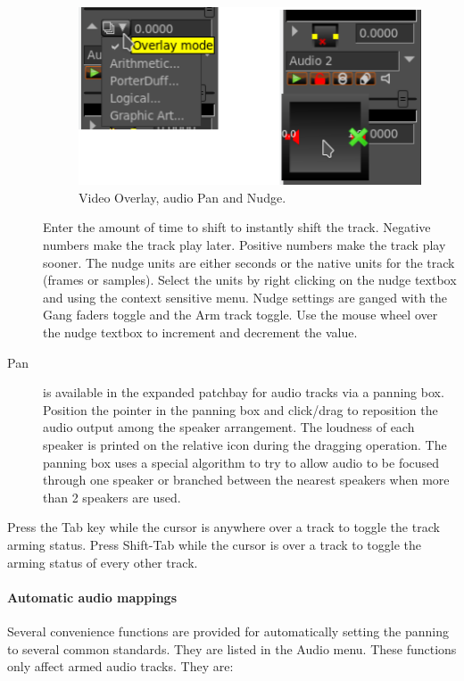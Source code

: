 \begin{description}
    \begin{figure}[htpb]
        \centering
        \includegraphics[width=0.7\linewidth]{images/overlay.png}
        \caption{Video Overlay, audio Pan and Nudge.}
        \label{fig:overlay}
    \end{figure}
    
    Enter the amount of time to shift to instantly shift the track. Negative numbers make the track play later. Positive numbers make the track play sooner. The nudge units are either seconds or the native units for the track (frames or samples). Select the units by right clicking on the nudge textbox and using the context sensitive menu. Nudge settings are ganged with the Gang faders toggle and the Arm track toggle. Use the mouse wheel over the nudge textbox to increment and decrement the value.
    \item[Pan] is available in the expanded patchbay for audio tracks via a panning box. Position the pointer in the panning box and click/drag to reposition the audio output among the speaker arrangement. The loudness of each speaker is printed on the relative icon during the dragging operation. The panning box uses a special algorithm to try to allow audio to be focused through one speaker or branched between the nearest speakers when more than 2 speakers are used.  
\end{description}

Press the Tab key while the cursor is anywhere over a track to toggle the track arming status. Press Shift-Tab while the cursor is over a track to toggle the arming status of every other track.

\paragraph{Automatic audio mappings}
Several convenience functions are provided for automatically setting the panning to several common standards. They are listed in the Audio menu. These functions only affect armed audio tracks. They are:

